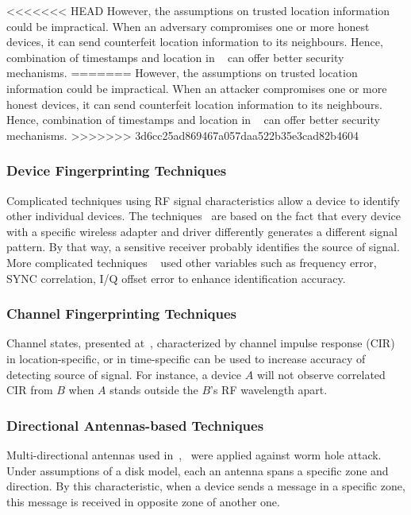 <<<<<<< HEAD
However, the assumptions on trusted location information could be impractical. When an adversary compromises one or more honest devices, it can send counterfeit location information to its neighbours. Hence, combination of timestamps and location in ~\cite{Shokri:2009:PSN:1514274.1514302} can offer better security mechanisms.
=======
However, the assumptions on trusted location information could be impractical. When an attacker compromises one or more honest devices, it can send counterfeit location information to its neighbours. Hence, combination of timestamps and location in ~\cite{Shokri:2009:PSN:1514274.1514302} can offer better security mechanisms.
>>>>>>> 3d6cc25ad869467a057daa522b35e3cad82b4604

\subsubsection*{Device Fingerprinting Techniques}

Complicated techniques using RF signal characteristics allow a device to identify other individual devices. The techniques~ \cite{Kasper, OktayUreten2007, VladimirBrik} are based on the fact that every device with a specific wireless adapter and driver differently generates a different signal pattern. By that way, a sensitive receiver probably identifies the source of signal. More complicated techniques ~\cite{SumanJana, 5211943, 819017} used other variables such as frequency error, SYNC correlation, I/Q offset error to enhance identification accuracy. 

\subsubsection*{Channel Fingerprinting Techniques}

Channel states, presented at~\cite{4289438, LiangXiao2008,LiangXiao2009,Liu:2009:SWC:1823633}, characterized by channel impulse response (CIR) in location-specific, or in time-specific can be used to increase accuracy of detecting source of signal. For instance, a device $A$ will not observe correlated CIR from $B$ when $A$ stands outside the $B$'s RF wavelength apart.

\subsubsection*{Directional Antennas-based Techniques}

Multi-directional antennas used in~\cite{Hu04usingdirectional},~\cite{RuiZhang2010} were applied against worm hole attack. Under assumptions of a disk model, each an antenna spans a specific zone and direction. By this characteristic, when a device sends a message in a specific zone, this message is received in opposite zone of another one. 

